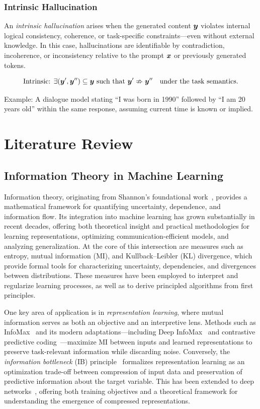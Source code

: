 \documentclass[11pt, oneside]{book}
\theoremstyle{plain}
\theoremstyle{definition}
\theoremstyle{remark}
\begin{document}
\subsection*{Intrinsic Hallucination}

An \emph{intrinsic hallucination} arises when the generated content ${\bm{y}}$ violates internal logical consistency, coherence, or task-specific constraints—even without external knowledge. In this case, hallucinations are identifiable by contradiction, incoherence, or inconsistency relative to the prompt ${\bm{x}}$ or previously generated tokens.

\[
\text{Intrinsic: } \exists ({\bm{y}}', {\bm{y}}'') \subseteq {\bm{y}} \text{ such that } {\bm{y}}' \nRightarrow {\bm{y}}'' \quad \text{under the task semantics}.
\]

Example: A dialogue model stating ``I was born in 1990'' followed by ``I am 20 years old'' within the same response, assuming current time is known or implied.


\chapter{Literature Review}

\section{Information Theory in Machine Learning}

Information theory, originating from Shannon’s foundational work~\citep{shannon1948mathematical}, provides a mathematical framework for quantifying uncertainty, dependence, and information flow. Its integration into machine learning has grown substantially in recent decades, offering both theoretical insight and practical methodologies for learning representations, optimizing communication-efficient models, and analyzing generalization. At the core of this intersection are measures such as entropy, mutual information (MI), and Kullback–Leibler (KL) divergence, which provide formal tools for characterizing uncertainty, dependencies, and divergences between distributions. These measures have been employed to interpret and regularize learning processes, as well as to derive principled algorithms from first principles.

One key area of application is in \emph{representation learning}, where mutual information serves as both an objective and an interpretive lens. Methods such as InfoMax~\citep{linsker1988self} and its modern adaptations—including Deep InfoMax~\citep{hjelm2019learning} and contrastive predictive coding~\citep{oord2018representation}—maximize MI between inputs and learned representations to preserve task-relevant information while discarding noise. Conversely, the \emph{information bottleneck} (IB) principle~\citep{tishby2000information} formalizes representation learning as an optimization trade-off between compression of input data and preservation of predictive information about the target variable. This has been extended to deep networks~\citep{alemi2017deep}, offering both training objectives and a theoretical framework for understanding the emergence of compressed representations.
\end{document}
